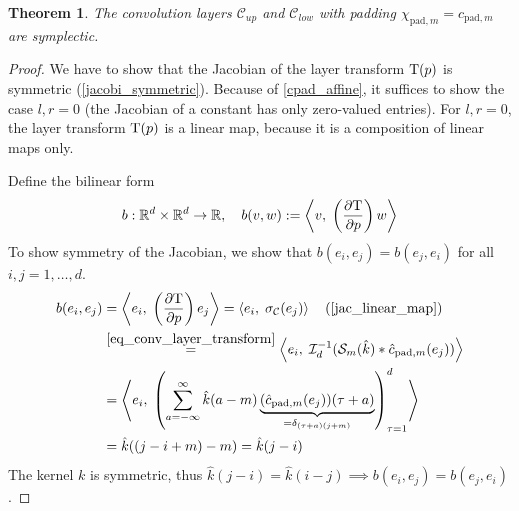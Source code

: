 \documentclass[twoside,a4paper]{article}
\newtheorem{theorem}{Theorem}
\begin{document}
\begin{theorem}\label{thm_conv_const_pad_symplectic}
	The convolution layers $\mathcal{C}_{up}$ and $\mathcal{C}_{low}$
	with padding $\chi_{\text{pad},m} = c_{\text{pad},m}$ are symplectic.
\end{theorem}
\begin{proof}
	We have to show that the Jacobian of the layer transform $\mathrm{T}(p)$
	is symmetric (\cref{jacobi_symmetric}).
	Because of \cref{cpad_affine}, it suffices to show the case $l,r=0$ (the Jacobian
	of a constant has only zero-valued entries). For $l,r=0$, the layer transform 
	$\mathrm{T}(p)$ 
	is a linear map, because it is a composition of linear maps only.

	Define the bilinear form
	\begin{equation}\label{eq_bilinear_proof_conv}
		b : \mathbb{R}^d \times \mathbb{R}^d \to \mathbb{R},
		\quad b(v,w) := \left\langle v,\; \left( \frac{\partial \mathrm{T}}{\partial p} \right) w \right\rangle
	\end{equation}
	To show symmetry of the Jacobian, we show that 
	$b(e_i, e_j) = b(e_j, e_i)$ for all $i,j=1,\dots,d$.
	\begin{align*}
		b(e_i, e_j) &= \ip{e_i}{\lb \jac{\layertf}{p} \rb e_j}
		= \ip{e_i}{\activation_{\mathcal{C}}(e_j)} \quad \text{(\cref{jac_linear_map})} \\
		&\stackrel{\cref{eq_conv_layer_transform}}{=} \ip{e_i}{\mathcal{I}_{d}^{-1} (
			\mathcal{S}_{m}(\hat{k}) * \hat{c}_{\text{pad},m}(e_j)
		)} \\
		&= \ip{e_i}{
			\lb \sum_{a=-\infty}^{\infty} 
				\hat{k}(a-m)
				\underbrace{(\hat{c}_{\text{pad},m}(e_j))(\tau+a)}_{
					= \delta_{(\tau+a) (j+m)}
				}
			\rb_{\tau=1}^d
		} \\
		&= \hat{k}((j-i+m)-m) = \hat{k}(j-i)
	\end{align*}
	The kernel $k$ is symmetric, thus $\hat{k}(j-i) = \hat{k}(i-j) \implies b(e_i, e_j) = b(e_j,e_i)$.
\end{proof}
\end{document}
